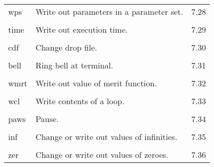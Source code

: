 \begin{center}
\begin{tabular}{lll}
\hspace{1.5em}wps   &    Write out parameters in a parameter set.  & \hspace{2em}7.28\\
\vspace{-3mm}& &\\
\hspace{1.5em}time  &         Write out execution time.            & \hspace{2em}7.29\\
\vspace{-3mm}& &\\
\hspace{1.5em}cdf   &        Change drop file.                     & \hspace{2em}7.30\\
\vspace{-3mm}& &\\
\hspace{1.5em}bell  &         Ring bell at terminal.               & \hspace{2em}7.31\\
\vspace{-3mm}& &\\
\hspace{1.5em}wmrt  &         Write out value of merit function.   & \hspace{2em}7.32\\
\vspace{-3mm}& &\\
\hspace{1.5em}wcl   &         Write contents of a loop.            & \hspace{2em}7.33\\
\vspace{-3mm}& &\\
\hspace{1.5em}paws  &         Pause.                               & \hspace{2em}7.34\\
\vspace{-3mm}& &\\
\hspace{1.5em}inf  &     Change or write out values of infinities. & \hspace{2em}7.35\\
\vspace{-3mm}& &\\
\hspace{1.5em}zer  &     Change or write out values of zeroes.    & \hspace{2em}7.36\\

\end{tabular}
\end{center}
